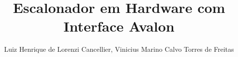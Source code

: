 \documentclass[12pt]{article}
\title{Escalonador em Hardware com Interface Avalon}
\author{Luiz Henrique de Lorenzi Cancellier, Vinicius Marino Calvo Torres de Freitas}
\begin{document}
 

\maketitle
     
\begin{resumo} 

    

\end{resumo}




%

%





\end{document}
